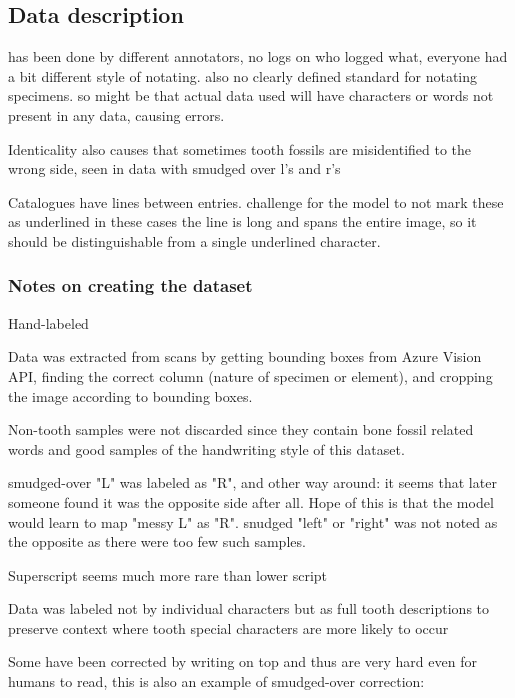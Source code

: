 \documentclass{article}
\begin{document}

\subsection{Data description}

has been done by different annotators, no logs on who logged what, everyone 
had a bit different style of notating. also no clearly defined standard 
for notating specimens. so might be that actual data used will have 
characters or words not present in any data, causing errors.


Identicality also causes that sometimes tooth fossils are misidentified to 
the wrong side, seen in data with smudged over l's and r's

Catalogues have lines between entries. challenge for the model to not mark these as underlined
in these cases the line is long and spans the entire image, so it should be distinguishable from 
a single underlined character.

\subsubsection{Notes on creating the dataset}

Hand-labeled

Data was extracted from scans by getting bounding boxes from Azure Vision API,
finding the correct column (nature of specimen or element), and cropping the image 
according to bounding boxes.

Non-tooth samples were not discarded since they contain 
bone fossil related words and good samples of the handwriting style of this dataset.

smudged-over "L" was labeled as "R", and other way around: it seems that later 
someone found it was the opposite side after all. Hope of this is that the model 
would learn to map "messy L" as "R". snudged "left" or "right" was not noted as the 
opposite as there were too few such samples.

Superscript seems much more rare than lower script

Data was labeled not by individual characters but as full tooth descriptions
to preserve context where tooth special characters are more likely to occur

Some have been corrected by writing on top and thus are very hard 
even for humans to read, this is also an example of smudged-over correction: 
\end{document}
